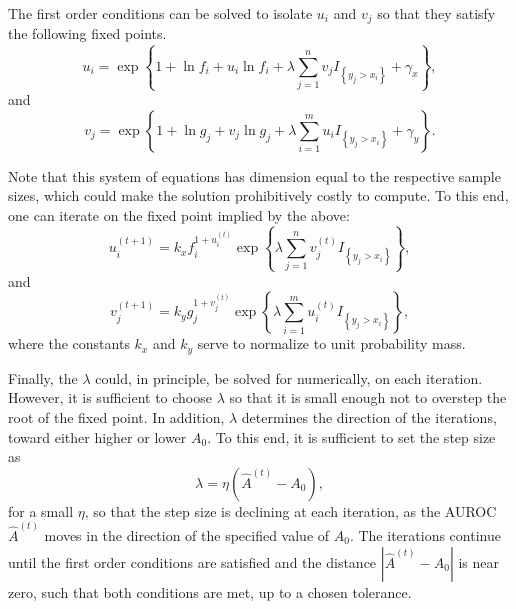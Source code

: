 The first order conditions can be solved to isolate $u_i$ and $v_j$ so that they satisfy the following fixed points.
\begin{equation}
    u_i = \exp{ \left\{ 1 + \ln f_i + u_i \ln f_i
                + \lambda \sum_{j = 1}^{n} v_j I_{\left\{ y_j > x_i \right\}} + \gamma_x \right\} },
\end{equation}
\noindent and
\begin{equation}
    v_j = \exp{ \left\{ 1 + \ln g_j + v_j \ln g_j
                + \lambda \sum_{i = 1}^{m} u_i I_{\left\{ y_j > x_i \right\}} + \gamma_y \right\} }.
\end{equation}

Note that this system of equations has dimension equal to the respective sample sizes, which could make the solution prohibitively costly to compute.
To this end, one can iterate on the fixed point implied by the above:
\begin{equation}
    u_i^{(t+1)} = k_x f_i ^{1 + u_i^{(t)}}
                \exp{ \left\{ \lambda \sum_{j = 1}^{n} v_j^{(t)} I_{\left\{ y_j > x_i \right\}} \right\} },
\end{equation}
and
\begin{equation}
    v_j^{(t+1)} = k_y g_j ^{1 + v_j^{(t)}}
                \exp{ \left\{ \lambda \sum_{i = 1}^{m} u_i^{(t)} I_{\left\{ y_j > x_i \right\}}  \right\} },
\end{equation}
% 
\noindent where the constants $k_x$ and $k_y$ serve to normalize to unit probability mass.



Finally, the $\lambda$ could, in principle, be solved for numerically, on each iteration.
However, it is sufficient to choose $\lambda$ so that it is small enough not to overstep the root of the fixed point.
In addition, $\lambda$ determines the direction of the iterations, toward either higher or lower $A_0$.
To this end, it is sufficient to set the step size as
\begin{equation}
    \lambda = \eta (\hat{A}^{(t)} - A_0),
\end{equation}
for a small $\eta$, so that the step size is declining at each iteration, as the AUROC $\hat{A}^{(t)}$ moves in the direction of the specified value of $A_0$.
The iterations continue until the first order conditions are satisfied and the distance $|\hat{A}^{(t)} - A_0|$ is near zero, such that both conditions are met, up to a chosen tolerance.


